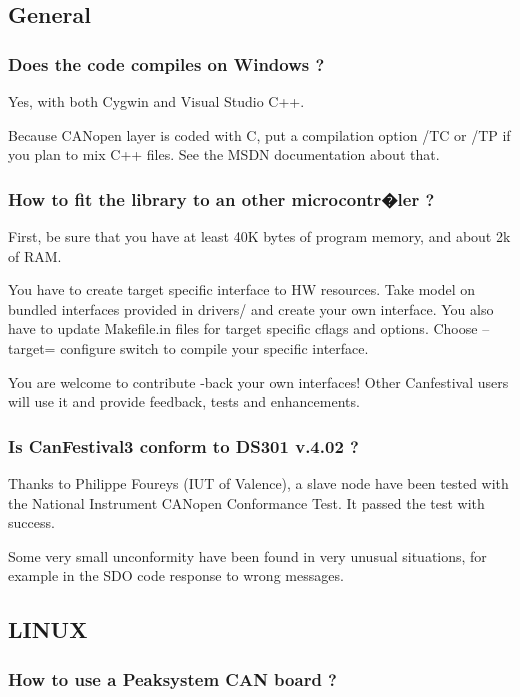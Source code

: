 \documentclass[12pt,english,a4paper]{book}
\newcommand{\canopen}{CANopen }
\begin{document}
\subsection{General}


\subsubsection{Does the code compiles on Windows ?}

Yes, with both Cygwin and Visual Studio C++. 

Because \canopen layer is coded with C, put a compilation option
/TC or /TP if you plan to mix C++ files. See the MSDN documentation
about that.


\subsubsection{How to fit the library to an other microcontr�ler ?}

First, be sure that you have at least 40K bytes of program memory,
and about 2k of RAM.

You have to create target specific interface to HW resources. Take
model on bundled interfaces provided in drivers/ and create your own
interface. You also have to update Makefile.in files for target specific
cflags and options. Choose {--}target= configure switch to compile
your specific interface.

You are welcome to contribute -back your own interfaces! Other Canfestival
users will use it and provide feedback, tests and enhancements.


\subsubsection{Is CanFestival3 conform to DS301 v.4.02 ?}

Thanks to Philippe Foureys (IUT of Valence), a slave node have been
tested with the National Instrument \canopen Conformance Test. It
passed the test with success.

Some very small unconformity have been found in very unusual situations,
for example in the SDO code response to wrong messages.


\subsection{LINUX}


\subsubsection{How to use a Peaksystem CAN board ?}
\end{document}
